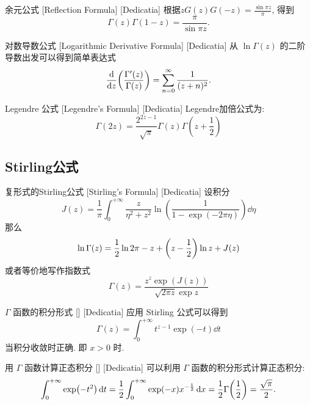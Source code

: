         \begin{ppt}
            {余元公式}
            [Reflection Formula]
            [Dedicatia]
            根据$zG(z)G(-z)=\frac{\sin\pi z}{\pi}$, 得到
            \[\Gamma(z)\Gamma(1-z)=\frac{\pi}{\sin\pi z}.\]
        \end{ppt}

        \begin{ppt}
            {对数导数公式}
            [Logarithmic Derivative Formula]
            [Dedicatia]
            从 \(\ln\Gamma(z)\) 的二阶导数出发可以得到简单表达式
            \[\dv{z}(\frac{\Gamma'(z)}{\Gamma(z)})=\sum_{n=0}^{\infty}\frac{1}{(z+n)^2}.\]
        \end{ppt}

        \begin{ppt}
            {Legendre 公式}
            [Legendre's Formula]
            [Dedicatia]
            Legendre加倍公式为:
            \[\Gamma(2z)=\frac{2^{2z-1}}{\sqrt{\pi}}\Gamma(z)\Gamma(z+\frac{1}{2})\]
        \end{ppt}

    \subsection{Stirling公式}

        \begin{thm}
            [Stirling]
            {复形式的Stirling公式}
            [Stirling's Formula]
            [Dedicatia]
            设积分
            \[J(z)=\frac{1}{\pi}\int_{0}^{+\infty}\frac{z}{\eta^2+z^2}\ln(\frac{1}{1-\exp(-2\pi\eta)})\dd{\eta}\]
            那么
            \[\ln\Gamma(z)=\frac{1}{2}\ln 2\pi-z+\qty(z-\frac{1}{2})\ln z+J(z)\]
            或者等价地写作指数式
            \[\Gamma(z)=\frac{z^{z}\exp(J(z))}{\sqrt{2\pi z}\exp z}\]
        \end{thm}

        \begin{thm}
            {\(\Gamma\) 函数的积分形式}
            []
            [Dedicatia]
            应用 Stirling 公式可以得到
            \[\Gamma(z)=\int_{0}^{+\infty}t^{z-1}\exp(-t)\dd{t}\]
            当积分收敛时正确. 即 \(x>0\) 时.
        \end{thm}

        \begin{xmp}
            {用 \(\Gamma\) 函数计算正态积分}
            []
            [Dedicatia]
            可以利用 \(\Gamma\) 函数的积分形式计算正态积分:
            \[\int_{0}^{+\infty}\exp(-t^2)\dd{t}=\frac{1}{2}\int_{0}^{+\infty}\exp(-x)x^{-\frac{1}{2}}\dd{x}=\frac{1}{2}\Gamma\qty(\frac{1}{2})=\frac{\sqrt{\pi}}{2}.\]
        \end{xmp}

